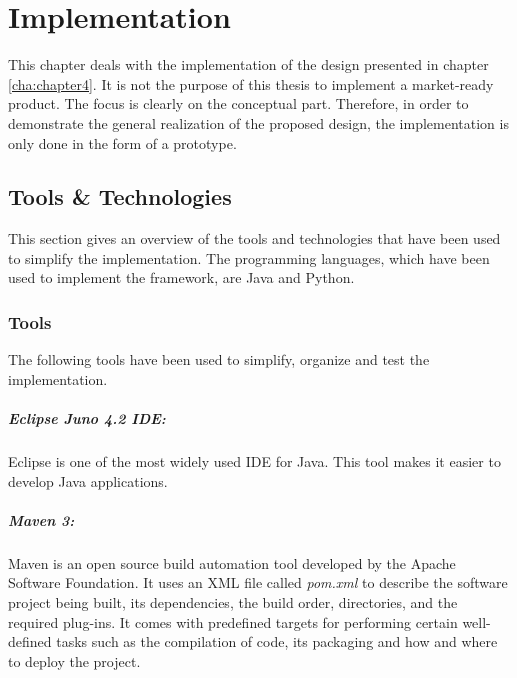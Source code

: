 \chapter{Implementation\label{cha:chapter5}}
This chapter deals with the implementation of the design presented in chapter \ref{cha:chapter4}. It is not the purpose of this thesis to implement a market-ready product. The focus is clearly on the conceptual part. Therefore, in order to demonstrate the general realization of the proposed design, the implementation is only done in the form of a prototype.



\section{Tools \& Technologies\label{sec:impl_tools_tech}}	
This section gives an overview of the tools and technologies that have been used to simplify the implementation. The programming languages, which have been used to implement the framework, are Java and Python.

\subsection{Tools\label{sec:impl_tools}}
The following tools have been used to simplify, organize and test the implementation.

\paragraph{Eclipse Juno 4.2 IDE:\label{sec:impl_eclipse}} Eclipse is one of the most widely used IDE for Java. This tool makes it easier to develop Java applications. 

\paragraph{Maven 3:\label{sec:impl_maven}} Maven is an open source build automation tool developed by the Apache Software Foundation. It uses an \ac{XML} file called \textit{pom.xml} to describe the software project being built, its dependencies, the build order, directories, and the required plug-ins. It comes with predefined targets for performing certain well-defined tasks such as the compilation of code, its packaging and how and where to deploy the project.


